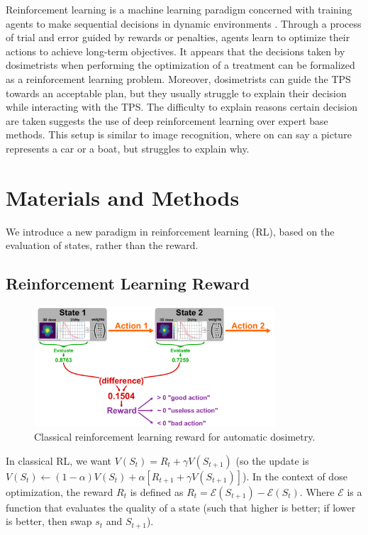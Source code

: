 Reinforcement learning is a machine learning paradigm concerned with training agents to make sequential decisions in dynamic environments \cite{brooks_what_2021}.
Through a process of trial and error guided by rewards or penalties, agents learn to optimize their actions to achieve long-term objectives.
It appears that the decisions taken by dosimetrists when performing the optimization of a treatment can be formalized as a reinforcement learning problem.
Moreover, dosimetrists can guide the TPS towards an acceptable plan, but they usually struggle to explain their decision while interacting with the TPS.
The difficulty to explain reasons certain decision are taken suggests the use of deep reinforcement learning over expert base methods.
This setup is similar to image recognition, where on can say a picture represents a car or a boat, but struggles to explain why.

\section{Materials and Methods}
We introduce a new paradigm in reinforcement learning (RL), based on the evaluation of states, rather than the reward.

\subsection{Reinforcement Learning Reward}

\begin{figure}
	\centering
	\includegraphics[width=0.8\textwidth]{reward.pdf}
	\caption{Classical reinforcement learning reward for automatic dosimetry.}
	\label{fig:reward_fig}
\end{figure}

In classical RL, we want $V(S_t) = R_t + \gamma V(S_{t+1})$
(so the update is $V(S_t) \leftarrow (1-\alpha) V(S_t) + \alpha \left[ R_{t+1} + \gamma V(S_{t+1}) \right]$).
In the context of dose optimization, the reward $R_t$ is defined as $R_t = \mathcal{E}(S_{t+1}) - \mathcal{E}(S_t)$.
Where $\mathcal{E}$ is a function that evaluates the quality of a state (such that higher is better; if lower is better, then swap $s_t$ and $S_{t+1}$).

